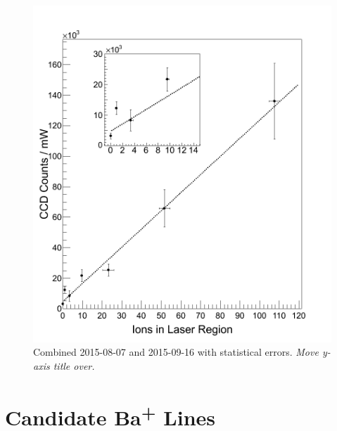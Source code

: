 \begin{figure} %
        \centering
                \includegraphics[width=.7\textwidth]{figures/fitgrouped_20150807_20150916_inset.png}
                \caption{Combined 2015-08-07 and 2015-09-16 with statistical errors.  \emph{\color{gray}Move y-axis title over.}}
\label{fig:lin}
\end{figure}

\section{Candidate Ba\textsuperscript{+} Lines}
\label{sec:BaPlus}